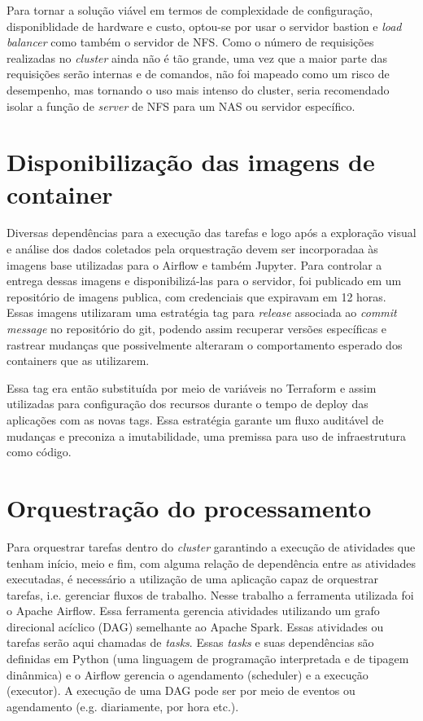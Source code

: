 Para tornar a solução viável em termos de complexidade de configuração, disponiblidade de hardware e custo, optou-se por usar o servidor bastion e \emph{load balancer} como também o servidor de NFS. Como o número de requisições realizadas no \emph{cluster} ainda não é tão grande, uma vez que a maior parte das requisições serão internas e de comandos, não foi mapeado como um risco de desempenho, mas tornando o uso mais intenso do cluster, seria recomendado isolar a função de \emph{server} de NFS para um NAS ou servidor específico.

\section{Disponibilização das imagens de container}

Diversas dependências para a execução das tarefas e logo após a exploração visual e análise dos dados coletados pela orquestração devem ser incorporadaa às imagens base utilizadas para o Airflow e também Jupyter. Para controlar a entrega dessas imagens e disponibilizá-las para o servidor, foi publicado em um repositório de imagens publica, com credenciais que expiravam em 12 horas. Essas imagens utilizaram uma estratégia tag para \emph{release} associada ao \emph{commit message} no repositório do git, podendo assim recuperar versões específicas e rastrear mudanças que possivelmente alteraram o comportamento esperado dos containers que as utilizarem. 

Essa tag era então substituída por meio de variáveis no Terraform e assim utilizadas para configuração dos recursos durante o tempo de deploy das aplicações com as novas tags. Essa estratégia garante um fluxo auditável de mudanças e preconiza a imutabilidade, uma premissa para uso de infraestrutura como código. 

\section{Orquestração do processamento}
Para orquestrar tarefas dentro do \emph{cluster} garantindo a execução de atividades que tenham início, meio e fim, com alguma relação de dependência entre as atividades executadas, é necessário a utilização de uma aplicação capaz de orquestrar tarefas, i.e. gerenciar fluxos de trabalho. Nesse trabalho a ferramenta utilizada foi o Apache Airflow\textregistered.  Essa ferramenta gerencia atividades utilizando um grafo direcional acíclico (DAG) semelhante ao Apache Spark\textregistered. Essas atividades ou tarefas serão aqui chamadas de \emph{tasks}. Essas \emph{tasks} e suas dependências são definidas em Python (uma linguagem de programação interpretada e de tipagem dinânmica) e o Airflow gerencia o agendamento (scheduler) e a execução (executor). A execução de uma DAG pode ser por meio de eventos ou agendamento (e.g. diariamente, por hora etc.).

